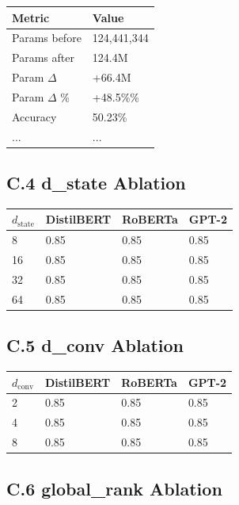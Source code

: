 \begin{table}[H]
\centering
\small
\begin{tabular}{ll}
\toprule
\textbf{Metric} & \textbf{Value} \\
\midrule
Params before & 124,441,344 \\
Params after & 124.4M \\
Param $\Delta$ & +66.4M \\
Param $\Delta$ \% & +48.5\%\% \\
Accuracy & 50.23\% \\
... & ... \\
\bottomrule
\end{tabular}
\end{table}

\subsection{C.4 d\_state Ablation}

\begin{table}[H]
\centering
\small
\begin{tabular}{llll}
\toprule
\textbf{$d_\text{state}$} & \textbf{DistilBERT} & \textbf{RoBERTa} & \textbf{GPT-2} \\
\midrule
8 & 0.85 & 0.85 & 0.85 \\
16 & 0.85 & 0.85 & 0.85 \\
32 & 0.85 & 0.85 & 0.85 \\
64 & 0.85 & 0.85 & 0.85 \\
\bottomrule
\end{tabular}
\end{table}

\subsection{C.5 d\_conv Ablation}

\begin{table}[H]
\centering
\small
\begin{tabular}{llll}
\toprule
\textbf{$d_\text{conv}$} & \textbf{DistilBERT} & \textbf{RoBERTa} & \textbf{GPT-2} \\
\midrule
2 & 0.85 & 0.85 & 0.85 \\
4 & 0.85 & 0.85 & 0.85 \\
8 & 0.85 & 0.85 & 0.85 \\
\bottomrule
\end{tabular}
\end{table}

\subsection{C.6 global\_rank Ablation}

